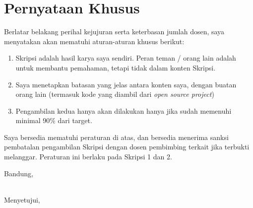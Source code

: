 \documentclass[a4paper,twoside]{article}
\begin{document}
\section{Pernyataan Khusus}
Berlatar belakang perihal kejujuran serta keterbasan jumlah dosen, saya menyatakan akan mematuhi aturan-aturan khusus berikut:
\begin{enumerate}
	\item Skripsi adalah hasil karya saya sendiri. Peran teman / orang lain adalah untuk membantu pemahaman, tetapi tidak dalam konten Skripsi.
	\item Saya menetapkan batasan yang jelas antara konten saya, dengan buatan orang lain (termasuk kode yang diambil dari {\it open source project})
	\item Pengambilan kedua hanya akan dilakukan hanya jika sudah memenuhi minimal 90\% dari target.
\end{enumerate}
Saya bersedia mematuhi peraturan di atas, dan bersedia menerima sanksi pembatalan pengambilan Skripsi dengan dosen pembimbing terkait jika terbukti melanggar. Peraturan ini berlaku pada Skripsi 1 dan 2.

\vspace{1.5cm}

\centering Bandung, \tanggal\\
\vspace{2cm} \nama \\ 
\vspace{1cm}

Menyetujui, \\
\end{document}
